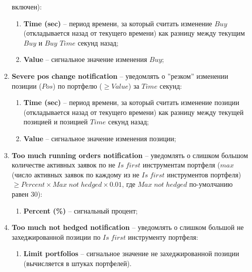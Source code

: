 \begin{enumerate}
		включен):
	\begin{enumerate}
		\item \textbf{Time (sec)} -- период времени, за который считать изменение $Buy$ (откладывается назад от текущего времени) как разницу между текущим
			$Buy$ и $Buy$ $Time$ секунд назад;
		\item \textbf{Value} -- сигнальное значение изменения $Buy$;
	\end{enumerate}
	\item \textbf{Severe pos change notification} -- уведомлять о ''резком'' изменении позиции ($Pos$) по портфелю ($\geq Value$) за $Time$ секунд:
	\begin{enumerate}
		\item \textbf{Time (sec)} -- период времени, за который считать изменение позиции (откладывается назад от текущего времени) как разницу между текущей
			позицией и позицией $Time$ секунд назад;
		\item \textbf{Value} -- сигнальное значение изменения позиции;
	\end{enumerate}
	\item \textbf{Too much running orders notification} -- уведомлять о слишком большом количестве активных заявок по не $Is \; first$ инструментам портфеля
		($max$ (число активных заявок по каждому из не $Is \; first$ инструментов портфеля) $\geq Percent \times Max \; not \; hedged \times 0.01$, где $Max \; not \; hedged$ по-умолчанию равен $30$):
	\begin{enumerate}
		\item \textbf{Percent (\%)} -- сигнальный процент;
	\end{enumerate}
	\item \textbf{Too much not hedged notification} -- уведомлять о слишком большой не захеджированной позиции по $Is \; first$ инструменту портфеля:
	\begin{enumerate}
		\item \textbf{Limit portfolios} -- сигнальное значение не захеджированной позиции (вычисляется в штуках портфелей).
	\end{enumerate}
\end{enumerate}

